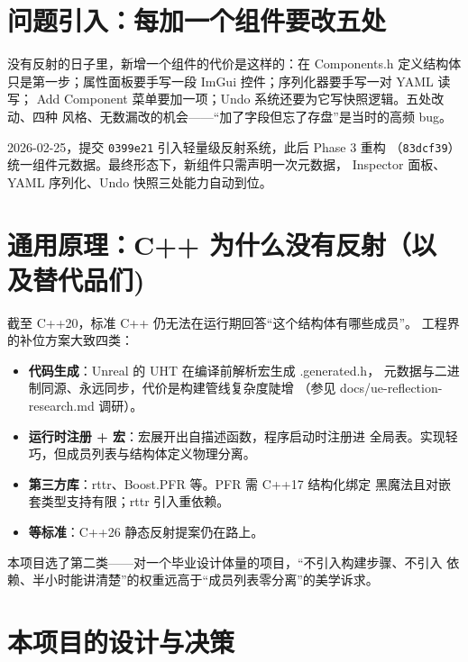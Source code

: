 \section{问题引入：每加一个组件要改五处}

没有反射的日子里，新增一个组件的代价是这样的：在 Components.h 定义结构体
只是第一步；属性面板要手写一段 ImGui 控件；序列化器要手写一对 YAML 读写；
Add Component 菜单要加一项；Undo 系统还要为它写快照逻辑。五处改动、四种
风格、无数漏改的机会——``加了字段但忘了存盘''是当时的高频 bug。

2026-02-25，提交 \texttt{0399e21} 引入轻量级反射系统，此后 Phase 3 重构
（\texttt{83dcf39}）统一组件元数据。最终形态下，新组件只需声明一次元数据，
Inspector 面板、YAML 序列化、Undo 快照三处能力自动到位。

\section{通用原理：C++ 为什么没有反射（以及替代品们)}

截至 C++20，标准 C++ 仍无法在运行期回答``这个结构体有哪些成员''。
工程界的补位方案大致四类：

\begin{itemize}
  \item \textbf{代码生成}：Unreal 的 UHT 在编译前解析宏生成 .generated.h，
        元数据与二进制同源、永远同步，代价是构建管线复杂度陡增
        （参见 docs/ue-reflection-research.md 调研）。
  \item \textbf{运行时注册 + 宏}：宏展开出自描述函数，程序启动时注册进
        全局表。实现轻巧，但成员列表与结构体定义物理分离。
  \item \textbf{第三方库}：rttr、Boost.PFR 等。PFR 需 C++17 结构化绑定
        黑魔法且对嵌套类型支持有限；rttr 引入重依赖。
  \item \textbf{等标准}：C++26 静态反射提案仍在路上。
\end{itemize}

本项目选了第二类——对一个毕业设计体量的项目，``不引入构建步骤、不引入
依赖、半小时能讲清楚''的权重远高于``成员列表零分离''的美学诉求。

\section{本项目的设计与决策}

